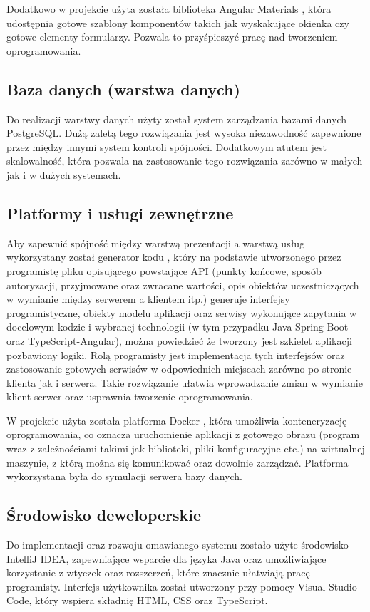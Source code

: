 Dodatkowo w projekcie użyta została biblioteka Angular Materials \cite{bib:angular_materials}, która udostępnia gotowe szablony komponentów takich jak wyskakujące okienka czy gotowe elementy formularzy. Pozwala to przyśpieszyć pracę nad tworzeniem oprogramowania.

\subsection{Baza danych (warstwa danych)}
Do realizacji warstwy danych użyty został system zarządzania bazami danych PostgreSQL. Dużą zaletą tego rozwiązania jest wysoka niezawodność zapewnione przez między innymi system kontroli spójności. Dodatkowym atutem jest skalowalność, która pozwala na zastosowanie tego rozwiązania zarówno w małych jak i w dużych systemach. 

\subsection{Platformy i usługi zewnętrzne}
Aby zapewnić spójność między warstwą prezentacji a warstwą usług wykorzystany został generator kodu \cite{bib:openapi_generator}, który na podstawie utworzonego przez programistę pliku opisującego powstające API (punkty końcowe, sposób autoryzacji, przyjmowane oraz zwracane wartości, opis obiektów uczestniczących w wymianie między serwerem a klientem itp.) generuje interfejsy programistyczne, obiekty modelu aplikacji oraz serwisy wykonujące zapytania w docelowym kodzie i wybranej technologii (w tym przypadku Java-Spring Boot oraz TypeScript-Angular), można powiedzieć że tworzony jest szkielet aplikacji pozbawiony logiki. Rolą programisty jest implementacja tych interfejsów oraz zastosowanie gotowych serwisów w odpowiednich miejscach zarówno po stronie klienta jak i serwera. Takie rozwiązanie ułatwia wprowadzanie zmian w wymianie klient-serwer oraz usprawnia tworzenie oprogramowania.

W projekcie użyta została platforma Docker \cite{bib:docker}, która umożliwia konteneryzację oprogramowania, co oznacza uruchomienie aplikacji z gotowego obrazu (program wraz z zależnościami takimi jak biblioteki, pliki konfiguracyjne etc.) na wirtualnej maszynie, z którą można się komunikować oraz dowolnie zarządzać. Platforma wykorzystana była do symulacji serwera bazy danych.

\subsection{Środowisko deweloperskie}
Do implementacji oraz rozwoju omawianego systemu zostało użyte środowisko IntelliJ IDEA, zapewniające wsparcie dla języka Java oraz umożliwiające korzystanie z wtyczek oraz rozszerzeń, które znacznie ułatwiają pracę programisty. Interfejs użytkownika został utworzony przy pomocy Visual Studio Code, który wspiera składnię HTML, CSS oraz TypeScript.